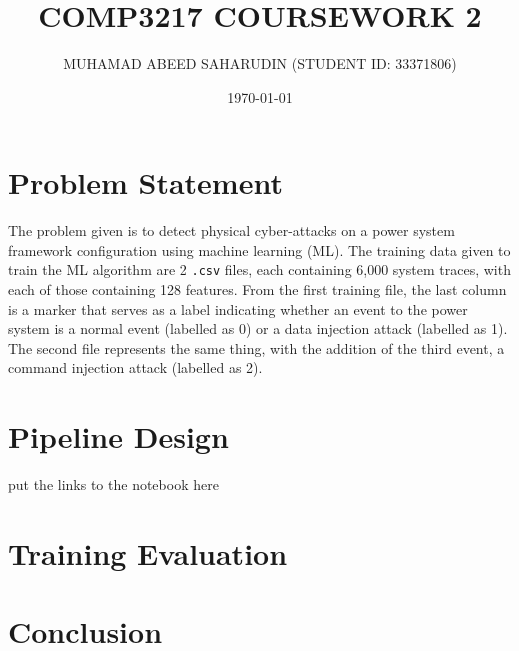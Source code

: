 \documentclass[12pt]{article}
\title{COMP3217 COURSEWORK 2}
\author{MUHAMAD ABEED SAHARUDIN (STUDENT ID: 33371806)}
\date{\today}
\begin{document}
    \maketitle

    \section{Problem Statement}

        The problem given is to detect physical cyber-attacks on a power system framework configuration using machine
        learning (ML). The training data given to train the ML algorithm are 2 \verb|.csv| files, each containing 6,000
        system traces, with each of those containing 128 features. From the first training file, the last column is a 
        marker that serves as a label indicating whether an event to the power system is a normal event (labelled as 0) 
        or a data injection attack (labelled as 1). The second file represents the same thing, with the addition of the 
        third event, a command injection attack (labelled as 2).

    \section{Pipeline Design}

    put the links to the notebook here

    \section{Training Evaluation}

    \section{Conclusion}
\end{document}
